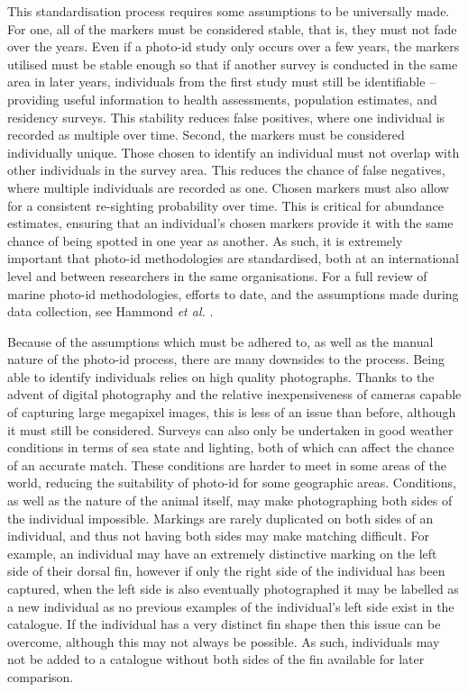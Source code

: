 This standardisation process requires some assumptions to be universally made. For one, all of the markers must be considered stable, that is, they must not fade over the years. Even if a photo-id study only occurs over a few years, the markers utilised must be stable enough so that if another survey is conducted in the same area in later years, individuals from the first study must still be identifiable -- providing useful information to health assessments, population estimates, and residency surveys. This stability reduces false positives, where one individual is recorded as multiple over time. Second, the markers must be considered individually unique. Those chosen to identify an individual must not overlap with other individuals in the survey area. This reduces the chance of false negatives, where multiple individuals are recorded as one. Chosen markers must also allow for a consistent re-sighting probability over time. This is critical for abundance estimates, ensuring that an individual's chosen markers provide it with the same chance of being spotted in one year as another. As such, it is extremely important that photo-id methodologies are standardised, both at an international level and between researchers in the same organisations. For a full review of marine photo-id methodologies, efforts to date, and the assumptions made during data collection, see Hammond \textit{et al.} \cite{hammond_estimating_2021}.

Because of the assumptions which must be adhered to, as well as the manual nature of the photo-id process, there are many downsides to the process. Being able to identify individuals relies on high quality photographs. Thanks to the advent of digital photography and the relative inexpensiveness of cameras capable of capturing large megapixel images, this is less of an issue than before, although it must still be considered. Surveys can also only be undertaken in good weather conditions in terms of sea state and lighting, both of which can affect the chance of an accurate match. These conditions are harder to meet in some areas of the world, reducing the suitability of photo-id for some geographic areas. Conditions, as well as the nature of the animal itself, may make photographing both sides of the individual impossible. Markings are rarely duplicated on both sides of an individual, and thus not having both sides may make matching difficult. For example, an individual may have an extremely distinctive marking on the left side of their dorsal fin, however if only the right side of the individual has been captured, when the left side is also eventually photographed it may be labelled as a new individual as no previous examples of the individual's left side exist in the catalogue. If the individual has a very distinct fin shape then this issue can be overcome, although this may not always be possible. As such, individuals may not be added to a catalogue without both sides of the fin available for later comparison. 

